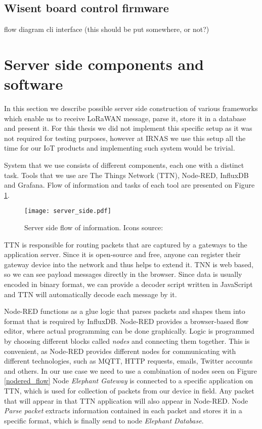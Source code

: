 \subsection{ Wisent board control firmware}
    flow diagram
    cli interface (this should be put somewhere, or not?)

\section{ Server side components and software}

In this section we describe possible server side construction of various frameworks which enable us to receive LoRaWAN message, parse it, store it in a database and present it.
For this thesis we did not implement this specific setup as it was not required for testing purposes, however at IRNAS we use this setup all the time for our IoT products and implementing such system would be trivial.

System that we use consists of different components, each one with a distinct task.
Tools that we use are The Things Network (TTN), Node-RED, InfluxDB and Grafana.
Flow of information and tasks of each tool are presented on Figure \ref{server_side}.

\begin{figure}[ht]
    \centering
    \texttt{[image: server\_side.pdf]} 
    \caption[Server side flow of information.]{Server side flow of information. Icons source:\cite{icons}}
    \label{server_side}
\end{figure}

TTN is responsible for routing packets that are captured by a gateways to the application server.
Since it is open-source and free, anyone can register their gateway device into the network and thus helps to extend it.
TNN is web based, so we can see payload messages directly in the browser.
Since data is usually encoded in binary format, we can provide a decoder script written in JavaScript and TTN will automatically decode each message by it.

Node-RED functions as a glue logic that parses packets and shapes them into format that is required by InfluxDB.
Node-RED provides a browser-based flow editor, where actual programming can be done graphically.
Logic is programmed by choosing different blocks called \textit{nodes} and connecting them together.
This is convenient, as Node-RED provides different nodes for communicating with different technologies, such as MQTT, HTTP requests, emails, Twitter accounts and others.
In our use case we need to use a combination of nodes seen on Figure \ref{nodered_flow}
Node \textit{Elephant Gateway} is connected to a specific application on TTN, which is used for collection of packets from our device in field.
Any packet that will appear in that TTN application will also appear in Node-RED.
Node \textit{Parse packet} extracts information contained in each packet and stores it in a specific format, which is finally send to node \textit{Elephant Database}.

